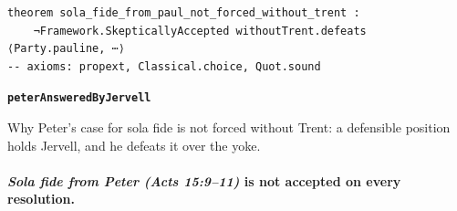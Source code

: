 \documentclass[11pt]{article}
\begin{document}
{\small\begin{verbatim}
theorem sola_fide_from_paul_not_forced_without_trent :
    ¬Framework.SkepticallyAccepted withoutTrent.defeats ⟨Party.pauline, ⋯⟩
-- axioms: propext, Classical.choice, Quot.sound
\end{verbatim}}
\par\medskip\noindent\textbf{\texttt{peter\allowbreak{}Answered\allowbreak{}By\allowbreak{}Jervell}}\par\nobreak\noindent
Why Peter's case for sola fide is not forced without Trent: a defensible position holds Jervell, and he defeats it over the yoke.

\paragraph{\emph{Sola fide from Peter (Acts 15:9–11)} is not accepted on every resolution.}
\end{document}
